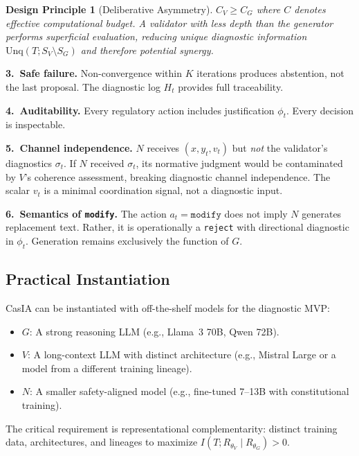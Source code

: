 \documentclass[11pt,a4paper]{article}
\newtheorem{principle}{Design Principle}[section]
\theoremstyle{definition}
\newcommand{\thetaG}{\theta_G}
\newcommand{\thetaV}{\theta_V}
\begin{document}
\begin{principle}[Deliberative Asymmetry]
\label{princ:asymmetry}
$C_V \geq C_G$ where $C$ denotes effective computational budget. A validator with less depth than the generator performs superficial evaluation, reducing unique diagnostic information $\mathrm{Unq}(T; S_V \setminus S_G)$ and therefore potential synergy.
\end{principle}

\textbf{3.~Safe failure.} Non-convergence within $K$ iterations produces abstention, not the last proposal. The diagnostic log $H_t$ provides full traceability.

\textbf{4.~Auditability.} Every regulatory action includes justification $\phi_t$. Every decision is inspectable.

\textbf{5.~Channel independence.} $N$ receives $(x, y_t, v_t)$ but \emph{not} the validator's diagnostics $\sigma_t$. If $N$ received $\sigma_t$, its normative judgment would be contaminated by $V$'s coherence assessment, breaking diagnostic channel independence. The scalar $v_t$ is a minimal coordination signal, not a diagnostic input.

\textbf{6.~Semantics of \texttt{modify}.} The action $a_t = \texttt{modify}$ does not imply $N$ generates replacement text. Rather, it is operationally a \texttt{reject} with directional diagnostic in $\phi_t$. Generation remains exclusively the function of $G$.

\subsection{Practical Instantiation}

CasIA can be instantiated with off-the-shelf models for the diagnostic MVP:
\begin{itemize}[leftmargin=*,itemsep=2pt]
\item $G$: A strong reasoning LLM (e.g., Llama~3 70B, Qwen 72B).
\item $V$: A long-context LLM with distinct architecture (e.g., Mistral Large or a model from a different training lineage).
\item $N$: A smaller safety-aligned model (e.g., fine-tuned 7--13B with constitutional training).
\end{itemize}
The critical requirement is representational complementarity: distinct training data, architectures, and lineages to maximize $I(T; R_{\thetaV} \mid R_{\thetaG}) > 0$.
\end{document}
